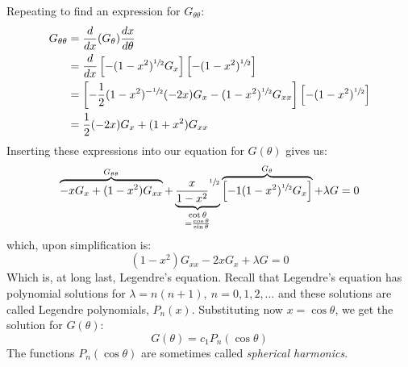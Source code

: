Repeating to find an expression for $G_{\theta\theta}$:
\begin{align*}
G_{\theta \theta} &= \frac{d}{dx}(G_{\theta})\frac{dx}{d\theta} \\
&=\frac{d}{dx}\left[-(1-x^2)^{\sfrac{1}{2}}G_x\right]\left[-(1-x^2)^{\sfrac{1}{2}}\right] \\
&=\left[-\frac{1}{2}(1-x^2)^{-\sfrac{1}{2}}(-2x)G_x - (1-x^2)^{\sfrac{1}{2}}G_{xx}\right]\left[-(1-x^2)^{\sfrac{1}{2}}\right] \\
&=\frac{1}{2}(-2x)G_x + (1+x^2)G_{xx}
\end{align*}
Inserting these expressions into our equation for $G(\theta)$ gives us:
\begin{equation*}
\overbrace{-xG_{x}+(1-x^2)G_{xx}}^{G_{\theta \theta}} + \underbrace{\frac{x}{1-x^2}^{\sfrac{1}{2}}}_{\substack{\cot{\theta} \\ = \frac{\cos{\theta}}{\sin{\theta}}}}\overbrace{\left[-1(1-x^2)^{\sfrac{1}{2}}G_x \right]}^{G_{\theta}} + \lambda G = 0
\end{equation*}
which, upon simplification is:
\begin{equation*}
(1-x^2)G_{xx} - 2xG_x + \lambda G = 0
\end{equation*}
Which is, at long last, Legendre's equation.  Recall that Legendre's equation has polynomial solutions for $\lambda = n(n+1), \ n=0,1,2,\dots$ and these solutions are called Legendre polynomials, $P_n(x)$. Substituting now $x = \cos{\theta}$, we get the solution for $G(\theta)$:
\begin{equation*}
G(\theta) = c_1P_n(\cos{\theta})
\end{equation*}
The functions $P_n(\cos{\theta})$ are sometimes called \emph{spherical harmonics}.

